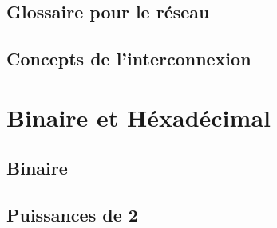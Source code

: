 \documentclass[12pt]{article}
\begin{document}
\subsection{Glossaire pour le réseau}

\subsection{Concepts de l’interconnexion}

\section{Binaire et Héxadécimal}


\subsection{Binaire}


\subsection{Puissances de 2}
\end{document}
